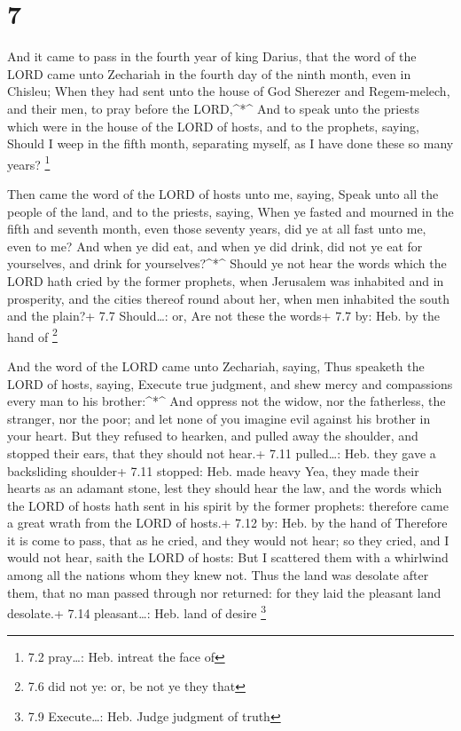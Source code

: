 \hypertarget{section-6}{%
\section{7}\label{section-6}}

 And it came to pass in the fourth year of king Darius, that
the word of the LORD came unto Zechariah in the fourth day of the ninth
month, even in Chisleu;  When they had sent unto the house
of God Sherezer and Regem-melech, and their men, to pray before the
LORD,\^{}*\^{}  And to speak unto the priests which were in
the house of the LORD of hosts, and to the prophets, saying, Should I
weep in the fifth month, separating myself, as I have done these so many
years? \footnote{7.2 pray\ldots: Heb. intreat the face of}

 Then came the word of the LORD of hosts unto me, saying,
 Speak unto all the people of the land, and to the priests,
saying, When ye fasted and mourned in the fifth and seventh month, even
those seventy years, did ye at all fast unto me, even to me?
 And when ye did eat, and when ye did drink, did not ye eat
for yourselves, and drink for yourselves?\^{}*\^{}  Should
ye not hear the words which the LORD hath cried by the former prophets,
when Jerusalem was inhabited and in prosperity, and the cities thereof
round about her, when men inhabited the south and the plain?+ 7.7
Should\ldots: or, Are not these the words+ 7.7 by: Heb. by the hand of
\footnote{7.6 did not ye: or, be not ye they that}

 And the word of the LORD came unto Zechariah, saying,
 Thus speaketh the LORD of hosts, saying, Execute true
judgment, and shew mercy and compassions every man to his
brother:\^{}*\^{}  And oppress not the widow, nor the
fatherless, the stranger, nor the poor; and let none of you imagine evil
against his brother in your heart.  But they refused to
hearken, and pulled away the shoulder, and stopped their ears, that they
should not hear.+ 7.11 pulled\ldots: Heb. they gave a backsliding
shoulder+ 7.11 stopped: Heb. made heavy  Yea, they made
their hearts as an adamant stone, lest they should hear the law, and the
words which the LORD of hosts hath sent in his spirit by the former
prophets: therefore came a great wrath from the LORD of hosts.+ 7.12 by:
Heb. by the hand of  Therefore it is come to pass, that as
he cried, and they would not hear; so they cried, and I would not hear,
saith the LORD of hosts:  But I scattered them with a
whirlwind among all the nations whom they knew not. Thus the land was
desolate after them, that no man passed through nor returned: for they
laid the pleasant land desolate.+ 7.14 pleasant\ldots: Heb. land of
desire \footnote{7.9 Execute\ldots: Heb. Judge judgment of truth}

